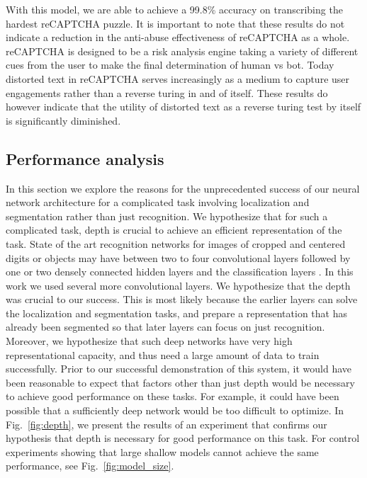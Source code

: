 \documentclass{article} \usepackage{comment}
\begin{document}
With this model, we are able to achieve a 99.8\% accuracy on transcribing the hardest reCAPTCHA puzzle. It is important to note that these results do not indicate a reduction in the anti-abuse effectiveness of reCAPTCHA as a whole. reCAPTCHA is designed to be a risk analysis engine taking a variety of different cues from the user to make the final determination of human vs bot. Today distorted text in reCAPTCHA serves increasingly as a medium to capture user engagements rather than a reverse turing in and of itself. These results do however indicate that the utility of distorted text as a reverse turing test by itself is significantly diminished.  

\subsection{Performance analysis}
\label{subsec:analysis}

In this section we explore the reasons for the unprecedented success of our neural network
architecture for a complicated task involving localization and segmentation rather than just
recognition. We hypothesize that for such a complicated task, depth is crucial to achieve an
efficient representation of the task. State of the art recognition networks for images of
cropped and centered digits or objects may have between two to four
convolutional layers followed by one or two densely connected hidden layers and the classification
layers \citep{Goodfellow-et-al-ICML2013}. In this work we used several more convolutional layers.
We hypothesize that the depth was crucial to our success. This is most likely because the earlier
layers can solve the localization and segmentation tasks, and prepare a representation that has
already been segmented so that later layers can focus on just recognition.
Moreover, we hypothesize
that such deep networks have very high representational capacity, and thus need a large amount of
data to train successfully.
Prior to our successful demonstration of this system, it would have
been reasonable to expect that factors other than just depth would be necessary
to achieve good performance on these tasks. For example, it could have been possible that
a sufficiently deep network would be too difficult to optimize. In Fig.~\ref{fig:depth}, we present the results of an experiment that confirms our hypothesis that
depth is necessary for good performance on this task. For control experiments
showing that large shallow models cannot achieve the same performance, see
Fig.~\ref{fig:model_size}.
\end{document}
